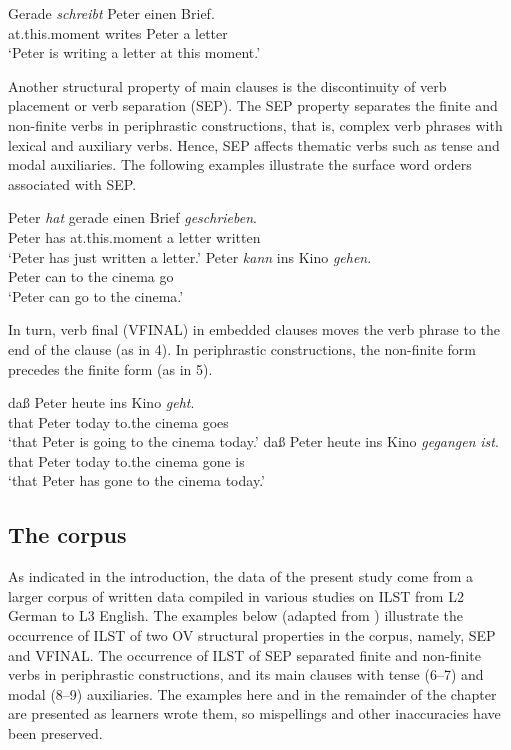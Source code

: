 \documentclass[output=paper,modfonts,nonflat, newtxmath]{langsci/langscibook}
\begin{document}
\ea%
  \label{ex:sanchez7:1}
  \gll Gerade \textit{schreibt} Peter einen Brief.\\
    at.this.moment writes Peter a letter\\
  \glt `Peter is writing a letter at this moment.’
  \z

Another structural property of main clauses is the discontinuity of verb placement or verb separation (SEP). The SEP property separates the finite and non-finite verbs in periphrastic constructions, that is, complex verb phrases with lexical and auxiliary verbs. Hence, SEP affects thematic verbs such as tense  and modal  auxiliaries. The following examples illustrate the surface word orders associated with SEP.

\ea%
  \label{ex:sanchez7:2}
  \gll Peter  \textit{hat} gerade  einen Brief  \textit{geschrieben}.  \\
    Peter has at.this.moment a letter written \\
  \glt ‘Peter has just written a letter.’
\ex %
  \label{ex:sanchez7:3}
  \gll Peter  \textit{kann} ins Kino  \textit{gehen}.  \\
    Peter can to the cinema go\\
  \glt ‘Peter can go to the cinema.’
\z


In turn, verb final (VFINAL) in embedded clauses moves the verb phrase to the end of the clause (as in 4). In periphrastic constructions, the non-finite form precedes the finite form (as in 5).

\ea%
  \label{ex:sanchez7:4}
  \gll  daß Peter heute ins Kino  \textit{geht}.   \\
    that Peter today to.the cinema  goes\\
  \glt ‘that Peter is going to the cinema today.’
\ex %
  \label{ex:sanchez7:5}
  \gll daß  Peter  heute  ins Kino  \textit{gegangen}  \textit{ist}.\\
    that  Peter  today  to.the cinema  gone is \\
  \glt ‘that Peter has gone to the cinema today.’
  \z

\subsection{The corpus} %


As indicated in the introduction, the data of the present study come from a larger corpus of written data compiled in various studies on ILST from L2 German to L3 English. The examples below (adapted from \citealt{Sánchez2011, Sánchez2015Background, Sánchez2016}) illustrate the occurrence of ILST of two OV structural properties in the corpus, namely, SEP and VFINAL. The occurrence of ILST of SEP separated finite and non-finite verbs in periphrastic constructions, and its main clauses with tense (6--7) and modal (8--9) auxiliaries. The examples here and in the remainder of the chapter are presented as learners wrote them, so mispellings and other inaccuracies have been preserved.
\end{document}
